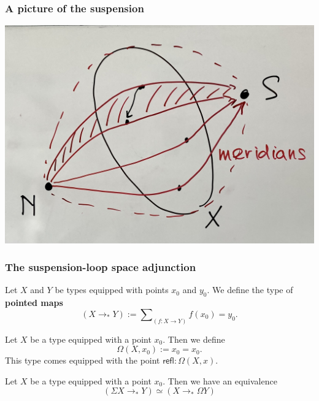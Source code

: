 \documentclass[handout]{beamer}
\newcommand{\refl}{\mathsf{refl}}
\begin{document}
\begin{frame}
  \frametitle{A picture of the suspension}
  \begin{center}
    \includegraphics[width=\textwidth]{suspension}
  \end{center}
\end{frame}

\begin{frame}
  \frametitle{The suspension-loop space adjunction}
  \begin{definition}
    Let $X$ and $Y$ be types equipped with points $x_0$ and $y_0$. We define the type of \textbf{pointed maps}
    \begin{equation*}
      (X\to_\ast Y):=\sum\nolimits_{(f:X\to Y)}f(x_0)=y_0.
    \end{equation*}
  \end{definition}

  \begin{definition}
    Let $X$ be a type equipped with a point $x_0$. Then we define
    \begin{equation*}
      \Omega(X,x_0):= x_0=x_0.
    \end{equation*}
    This type comes equipped with the point $\refl:\Omega(X,x)$. 
  \end{definition}
  
  \begin{theorem}
    Let $X$ be a type equipped with a point $x_0$. Then we have an equivalence
    \begin{equation*}
      (\Sigma X\to_\ast Y)\simeq (X\to_\ast\Omega Y)
    \end{equation*}
  \end{theorem}
\end{frame}
\end{document}
